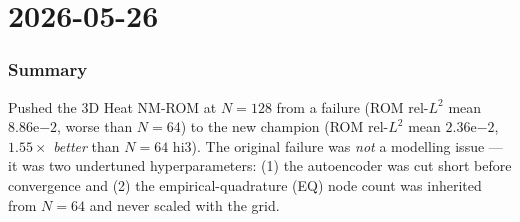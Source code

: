 \section{2026-05-26}


\subsubsection*{Summary}
Pushed the 3D Heat NM-ROM at $N=128$ from a failure (ROM rel-$L^2$ mean
$8.86\mathrm{e}{-2}$, worse than $N=64$) to the new champion
(ROM rel-$L^2$ mean $2.36\mathrm{e}{-2}$, $1.55\times$ \emph{better} than
$N=64$ hi3). The original failure was \emph{not} a modelling issue ---
it was two undertuned hyperparameters: (1) the autoencoder was cut
short before convergence and (2) the empirical-quadrature (EQ) node
count was inherited from $N=64$ and never scaled with the grid.

